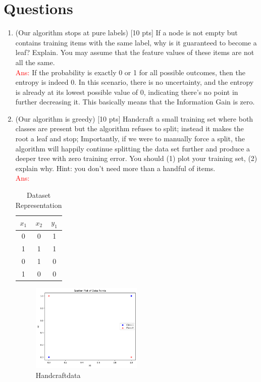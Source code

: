 \documentclass[a4paper]{article}
\theoremstyle{definition}
\newcommand{\red}[1]{\textcolor{red}{#1}}
\begin{document}
\section{Questions}
\begin{enumerate}
\item (Our algorithm stops at pure labels) [10 pts] If a node is not empty but contains training items with the same label, why is it guaranteed to become a leaf?  Explain. You may assume that the feature values of these items are not all the same. \\
\red{Ans:}  If the probability is exactly 0 or 1 for all possible outcomes, then the entropy is indeed 0. In this scenario, there is no uncertainty, and the entropy is already at its lowest possible value of 0, indicating there's no point in further decreasing it. This basically means that the Information Gain is zero. \\

\item (Our algorithm is greedy)  [10 pts] Handcraft a small training set where both classes are present but the algorithm refuses to split; instead it makes the root a leaf and stop;
Importantly, if we were to manually force a split, the algorithm will happily continue splitting the data set further and produce a deeper tree with zero training error.
You should (1) plot your training set, (2) explain why.  Hint: you don't need more than a handful of items. \\

\red{Ans:} 
\begin{table}[htbp]
\centering
\caption{Dataset Representation}
\begin{tabular}{ccc}
\hline
$x_1$ & $x_2$ & $y_1$ \\
\hline
0 & 0 & 1 \\
1 & 1 & 1 \\
0 & 1 & 0 \\
1 & 0 & 0 \\
\hline
\end{tabular}
\end{table}

\begin{figure}[htbp]
  \centering
  \includegraphics[width=0.5\textwidth]{Q2.2.png}
  \caption{Handcraftdata}
  \label{fig:Handcraftdata}
\end{figure}



\end{enumerate}
\end{document}
